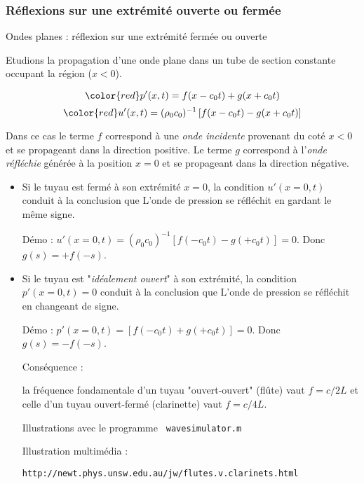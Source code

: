 \subsubsection{Réflexions sur une extrémité ouverte ou fermée}
\begin{frame}[fragile]{Ondes planes : réflexion sur une extrémité fermée ou ouverte}

\small

Etudions la propagation d'une onde plane dans un tube de section
constante occupant la région ($x<0$).

\[ \color{red}
	p'(x, t) =   f(x-c_0 t) + g(x+c_0 t)
\]
\[ \color{red}
	u'(x, t) = (\rho_0 c_0)^{-1} \left[  f(x-c_0 t) - g(x+c_0 t) \right]
\]

Dans ce cas le terme $f$ correspond à une {\em onde incidente} provenant du coté $x<0$ et se propageant dans la direction positive. Le terme $g$ correspond à l'{\em onde réfléchie} générée à la position $x=0$ et se propageant dans la direction négative.

\pause

\begin{itemize}


\item Si le tuyau est fermé à son extrémité $x=0$, la condition $u'(x=0,t)$ conduit à la conclusion que {\color{red} L'onde de pression se réfléchit en gardant le même signe}.

\textcolor{gris}{Démo : $u'(x=0,t) = (\rho_0 c_0)^{-1} [f(-c_0t) - g(+c_0t) ] = 0.$ Donc $g(s) = +f(-s)$.} 
\pause
\item Si le tuyau est "{\em idéalement ouvert}" à son extrémité, la condition $p'(x=0,t)=0$ conduit à 
la conclusion que {\color{red} L'onde de pression se réfléchit en changeant de signe}.

\textcolor{gris}{Démo : $p'(x=0,t) =  [f(-c_0t) + g(+c_0t) ] = 0.$ Donc $g(s) = -f(-s)$.} 
\pause
\medskip

Conséquence : 

la fréquence fondamentale d'un tuyau "ouvert-ouvert" (flûte) vaut $f = c/2L$ et celle d'un tuyau ouvert-fermé (clarinette) 
vaut $f= c/ 4L$.

{\color{bleu}

Illustrations avec le programme 
 \verb| wavesimulator.m |
 
Illustration multimédia : 
{\scriptsize
\begin{verbatim}
http://newt.phys.unsw.edu.au/jw/flutes.v.clarinets.html
\end{verbatim}
}

}

\medskip

\end{itemize}



\end{frame}



